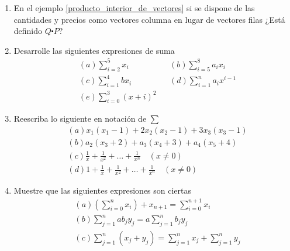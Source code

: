 \begin{ejercicio}
\begin{enumerate}
$$\begin{aligned}
        \end{aligned}
        $$ 
        \item En el ejemplo \ref{producto_interior_de_vectores} si se dispone de las cantidades y precios como vectores columna en lugar de vectores filas ¿Está definido \(Q \centerdot P\)?
        \item Desarrolle las siguientes expresiones de suma  
        $$ 
        \begin{aligned}
            & (a) \sum_{i=2}^{5} x_i  && (b) \sum_{i=5}^{8} a_ix_i \\
            & (c) \sum_{i=1}^{4} bx_i && (d) \sum_{i=1}^{n} a_ix^{i-1} \\
            & (e) \sum_{i=0}^{3} (x+i)^2
        \end{aligned}
        $$
        \item Reescriba lo siguiente en notación de \(\sum\) 
        $$ 
        \begin{aligned}
            & (a) x_1(x_1 - 1) + 2x_2(x_2 - 1) + 3x_3(x_3 - 1) \\
            & (b) a_2(x_3+2) + a_3(x_4+3)+a_4(x_5+4) \\
            & (c) \frac{1}{x}+ \frac{1}{x^2} + \dots + \frac{1}{x^n} \quad (x \neq 0) \\
            & (d) 1 + \frac{1}{x} + \frac{1}{x^2} + \dots + \frac{1}{x^n} \quad (x \neq 0) 
        \end{aligned}
        $$
        \item Muestre que las siguientes expresiones son ciertas
        $$ 
        \begin{aligned}
            & (a) \left(\sum_{i=0}^{n} x_i\right) + x_{n+1} = \sum_{i=0}^{n+1} x_i \\
            & (b) \sum_{j=1}^{n} ab_j y_j = a \sum_{j=1}^{n} b_j y_j \\
            & (c) \sum_{j=1}^{n} (x_j+y_j) = \sum_{j=1}^{n} x_j + \sum_{j=1}^{n} y_j
        \end{aligned}
        $$
    \end{enumerate}
\end{ejercicio}